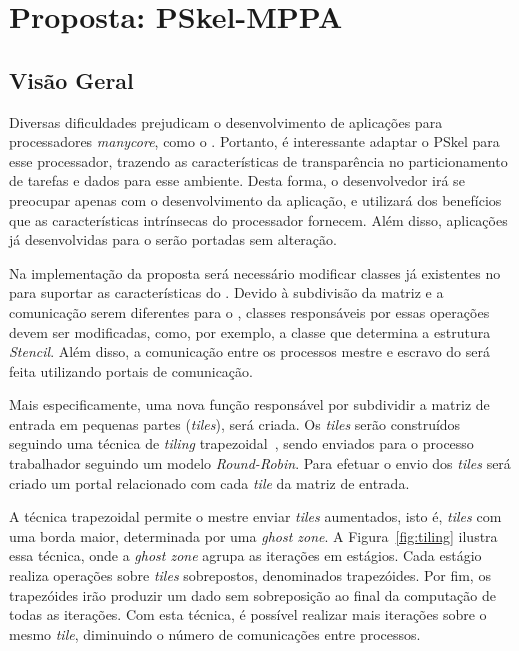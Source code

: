 \chapter{Proposta: PSkel-MPPA}
\label{cha:proposta}

\section{Visão Geral}

Diversas dificuldades prejudicam o desenvolvimento de aplicações para
processadores \textit{manycore}, como o \mppa. Portanto, é interessante adaptar
o \fw PSkel para esse processador, trazendo as características de transparência
no particionamento de tarefas e dados para esse ambiente. Desta forma, o
desenvolvedor irá se preocupar apenas com o desenvolvimento da aplicação, e
utilizará dos benefícios que as características intrínsecas do processador
fornecem. Além disso, aplicações já desenvolvidas para o \fw serão portadas sem
alteração.


Na implementação da proposta será necessário modificar classes já existentes
no \fw para suportar as características do \mppa. Devido à subdivisão da matriz
e a comunicação serem diferentes para o \mppa, classes responsáveis por essas
operações devem ser modificadas, como, por exemplo, a classe que determina a estrutura
\textit{Stencil}. Além disso, a comunicação entre os processos mestre e escravo
do \mppa será feita utilizando portais de comunicação.

Mais especificamente, uma nova função responsável por subdividir a matriz
de entrada em pequenas partes (\textit{tiles}), será criada.
Os \textit{tiles} serão construídos seguindo uma técnica de \textit{tiling}
trapezoidal~\cite{meng11}, sendo enviados para o processo trabalhador seguindo um modelo \textit{Round-Robin}.
Para efetuar o envio dos \textit{tiles} será criado um portal relacionado com
cada \textit{tile} da matriz de entrada.

A técnica trapezoidal permite o mestre enviar \textit{tiles} aumentados, isto é,
\textit{tiles} com uma borda maior, determinada por uma \textit{ghost zone}.
A Figura~\ref{fig:tiling} ilustra essa técnica, onde a \textit{ghost zone}
agrupa as iterações em estágios. Cada estágio realiza
operações sobre \textit{tiles} sobrepostos, denominados trapezóides.
Por fim, os trapezóides irão produzir um dado sem sobreposição ao final da
computação de todas as iterações.
Com esta técnica, é possível realizar mais iterações sobre o mesmo
\textit{tile}, diminuindo o número de comunicações entre processos.

